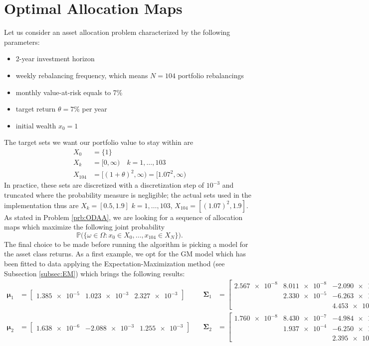 \section{Optimal Allocation Maps}\label{sec:Allocation_Maps}
Let us consider an asset allocation problem characterized by the following parameters:
\begin{itemize}
	\item 2-year investment horizon
	\item weekly rebalancing frequency, which means $N=104$ portfolio rebalancings
	\item monthly value-at-risk equals to 7\%
	\item target return $\theta=7\%$ per year
	\item initial wealth $x_0 = 1$
\end{itemize}
The target sets we want our portfolio value to stay within are 
\begin{align*}
X_0 & = \{1\}\\
X_k & = [0,\infty) \quad k = 1,\ldots,103 \\
X_{104} & = [(1+\theta)^2,\infty) = [1.07^2,\infty)
\end{align*}
In practice, these sets are discretized with a discretization step of $10^{-3}$ and truncated where the probability measure is negligible; the actual sets used in the implementation thus are $X_k = [0.5,1.9]$ $k=1,\ldots,103$, $X_{104}=[(1.07)^2,1.9]$. As stated in Problem \ref{prb:ODAA}, we are looking for a sequence of allocation maps which maximize the following joint probability
\[ \mathbb{P}\big(\{\omega \in \Omega : x_0 \in X_0,\ldots,x_{104} \in X_N \} \big).\]
The final choice to be made before running the algorithm is picking a model for the asset class returns. As a first example, we opt for the GM model which has been fitted to data applying the Expectation-Maximization method (see Subsection \ref{subsec:EM}) which brings the following results:
\begin{align*}
\bm{\mu}_1 & = 
\begin{bmatrix}
\num{1.385e-5} &  \num{1.023e-3} &  \num{2.327e-3}
\end{bmatrix}
\quad & \bm{\Sigma}_1 &= 
\begin{bmatrix}
\num{2.567e-8} & \num{8.011e-8} & \num{-2.090e-7} \\
& \num{2.330e-5}  & \num{-6.263e-5} \\
&                & \num{4.453e-4}
\end{bmatrix} \\
\bm{\mu}_2 & = \begin{bmatrix}
\num{1.638e-6} &  \num{-2.088e-3} &  \num{1.255e-3}
\end{bmatrix}
\quad & \bm{\Sigma}_2 &= 
\begin{bmatrix}
\num{1.760e-8} & \num{8.430e-7} & \num{-4.984e-7} \\
& \num{1.937e-4}  & \num{-6.250e-5} \\
&                & \num{2.395e-4}
\end{bmatrix}
\end{align*}

